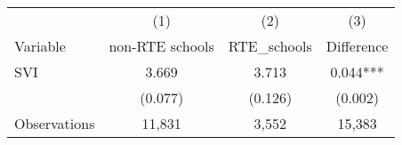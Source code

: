 \begin{tabular}{l*{3}c}
\hline\hline
 & (1) & (2) & (3) \\
Variable & non-RTE schools & RTE_schools & Difference \\
\hline
SVI&3.669&3.713&0.044***\\
&(0.077)&(0.126)&(0.002)\\
\hline
Observations & 11,831 & 3,552 & 15,383 \\
\hline\hline
\end{tabular}
